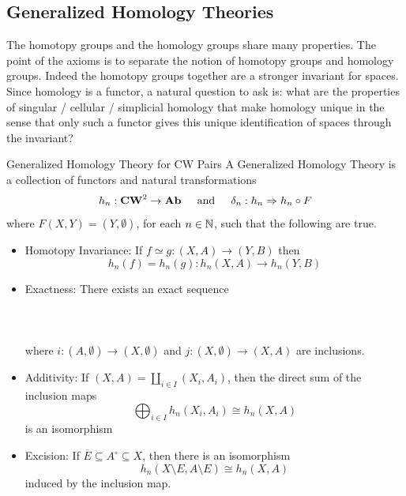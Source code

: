 \documentclass[a4paper]{article}
\begin{document}
\subsection{Generalized Homology Theories}
The homotopy groups and the homology groups share many properties. The point of the axioms is to separate the notion of homotopy groups and homology groups. Indeed the homotopy groups together are a stronger invariant for spaces. Since homology is a functor, a natural question to ask is: what are the properties of singular / cellular / simplicial homology that make homology unique in the sense that only such a functor gives this unique identification of spaces through the invariant? 

\begin{defn}{Generalized Homology Theory for CW Pairs}{} A Generalized Homology Theory is a collection of functors and natural transformations $$h_n:\bold{CW}^2\to\bold{Ab}\;\;\;\;\text{ and }\;\;\;\;\delta_n:h_n\Rightarrow h_n\circ F$$ where $F(X,Y)=(Y,\emptyset)$, for each $n\in\mathbb{N}$, such that the following are true. 
\begin{itemize}
\item Homotopy Invariance: If $f\simeq g:(X,A)\to(Y,B)$ then $$h_n(f)=h_n(g):h_n(X,A)\to h_n(Y,B)$$
\item Exactness: There exists an exact sequence \\~\\
\\~\\
where $i:(A,\emptyset)\to(X,\emptyset)$ and $j:(X,\emptyset)\to(X,A)$ are inclusions. 
\item Additivity: If $(X,A)=\coprod_{i\in I}(X_i,A_i)$, then the direct sum of the inclusion maps $$\bigoplus_{i\in I}h_n(X_i,A_i)\cong h_n(X,A)$$ is an isomorphism
\item Excision: If $\overline{E}\subseteq A^\circ\subseteq X$, then there is an isomorphism $$h_n(X\setminus E,A\setminus E)\cong h_n(X,A)$$ induced by the inclusion map. 
\end{itemize}
\end{defn}
\end{document}
